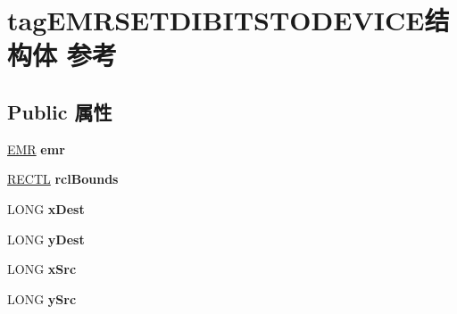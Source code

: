 \hypertarget{structtag_e_m_r_s_e_t_d_i_b_i_t_s_t_o_d_e_v_i_c_e}{}\section{tag\+E\+M\+R\+S\+E\+T\+D\+I\+B\+I\+T\+S\+T\+O\+D\+E\+V\+I\+C\+E结构体 参考}
\label{structtag_e_m_r_s_e_t_d_i_b_i_t_s_t_o_d_e_v_i_c_e}
\subsection*{Public 属性}
\begin{DoxyCompactItemize}
\item 
\mbox{\label{structtag_e_m_r_s_e_t_d_i_b_i_t_s_t_o_d_e_v_i_c_e_ae6f3ecade1579aec2ace8aad81d7dc88}} 
\hyperlink{structtag_e_m_r}{E\+MR} {\bfseries emr}
\item 
\mbox{\label{structtag_e_m_r_s_e_t_d_i_b_i_t_s_t_o_d_e_v_i_c_e_ac58860e9f699e3494e76e1fe8e87eaaf}} 
\hyperlink{struct___r_e_c_t_l}{R\+E\+C\+TL} {\bfseries rcl\+Bounds}
\item 
\mbox{\label{structtag_e_m_r_s_e_t_d_i_b_i_t_s_t_o_d_e_v_i_c_e_aae54101ee8e7808111e55be3576a8bed}} 
L\+O\+NG {\bfseries x\+Dest}
\item 
\mbox{\label{structtag_e_m_r_s_e_t_d_i_b_i_t_s_t_o_d_e_v_i_c_e_afc8bbd2c2a93052631f35c2a3d0f0094}} 
L\+O\+NG {\bfseries y\+Dest}
\item 
\mbox{\label{structtag_e_m_r_s_e_t_d_i_b_i_t_s_t_o_d_e_v_i_c_e_a898ce79732b1a82d5c6b4e21162a0f88}} 
L\+O\+NG {\bfseries x\+Src}
\item 
\mbox{\label{structtag_e_m_r_s_e_t_d_i_b_i_t_s_t_o_d_e_v_i_c_e_a539203f67ea3570c1bb917ee548e9fbf}} 
L\+O\+NG {\bfseries y\+Src}
\item 
\mbox{\label{structtag_e_m_r_s_e_t_d_i_b_i_t_s_t_o_d_e_v_i_c_e_ab7534a7d372daf39a5f0c3dce91abdcf}} 

\end{DoxyCompactItemize}

